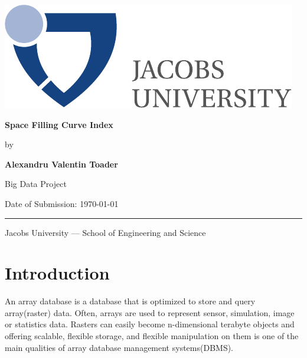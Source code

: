 \documentclass[11pt, a4paper, oneside]{article}
\newcommand{\myname}{Alexandru Valentin Toader}
\newcommand{\mytitle}{Space Filling Curve Index}
\begin{document}

  \thispagestyle{empty}

  \begin{flushright}
   \includegraphics[scale=0.7]{bsc-logo}
  \end{flushright}
  \vspace{20mm}
  \begin{center}
    \huge
    \textbf{\mytitle}
  \end{center}
  \vspace*{4mm}
  \begin{center}
   \Large by
  \end{center}
  \vspace*{4mm}
  \begin{center}
    \Large
    \textbf{\myname}
  \end{center}
  \vspace*{20mm}
  \begin{center}
    \large
    Big Data Project
  \end{center}
  \vfill
  \vspace*{8mm}
  \begin{flushleft}
    \large
    Date of Submission: \today \\
    \rule{\textwidth}{1pt}
  \end{flushleft}
  \begin{center}
    \Large Jacobs University --- School of Engineering and Science
  \end{center}

  \newpage


\newpage
\tableofcontents

\clearpage
{}

\section{Introduction}
An array database is a database that is optimized to store and query array(raster) data. Often, arrays are used to represent sensor, simulation, image or statistics data. Rasters can easily become n-dimensional terabyte objects and offering scalable, flexible storage, and flexible manipulation on them is one of the main qualities of array database management systems(DBMS). 
\end{document}
